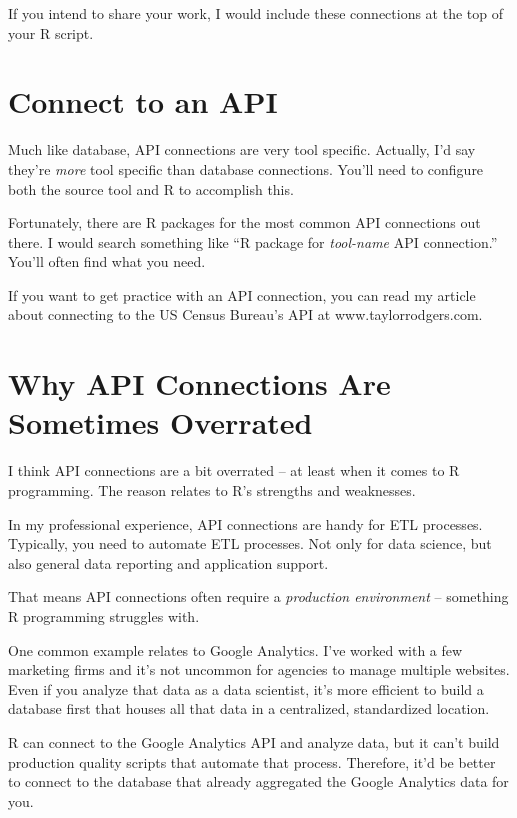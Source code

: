 \documentclass[
]{book}
\begin{document}
\begin{center}
If you intend to share your work, I would include these connections at the top of your R script.

\hypertarget{connect-to-an-api}{%
\section{Connect to an API}\label{connect-to-an-api}}

Much like database, API connections are very tool specific. Actually, I'd say they're \emph{more} tool specific than database connections. You'll need to configure both the source tool and R to accomplish this.

Fortunately, there are R packages for the most common API connections out there. I would search something like ``R package for \emph{tool-name} API connection.'' You'll often find what you need.

If you want to get practice with an API connection, you can read my article about connecting to the US Census Bureau's API at www.taylorrodgers.com.

\hypertarget{why-api-connections-are-sometimes-overrated}{%
\section{Why API Connections Are Sometimes Overrated}\label{why-api-connections-are-sometimes-overrated}}

I think API connections are a bit overrated -- at least when it comes to R programming. The reason relates to R's strengths and weaknesses.

In my professional experience, API connections are handy for ETL processes. Typically, you need to automate ETL processes. Not only for data science, but also general data reporting and application support.

That means API connections often require a \emph{production environment} -- something R programming struggles with.

One common example relates to Google Analytics. I've worked with a few marketing firms and it's not uncommon for agencies to manage multiple websites. Even if you analyze that data as a data scientist, it's more efficient to build a database first that houses all that data in a centralized, standardized location.

R can connect to the Google Analytics API and analyze data, but it can't build production quality scripts that automate that process. Therefore, it'd be better to connect to the database that already aggregated the Google Analytics data for you.


\end{center}
\end{document}
